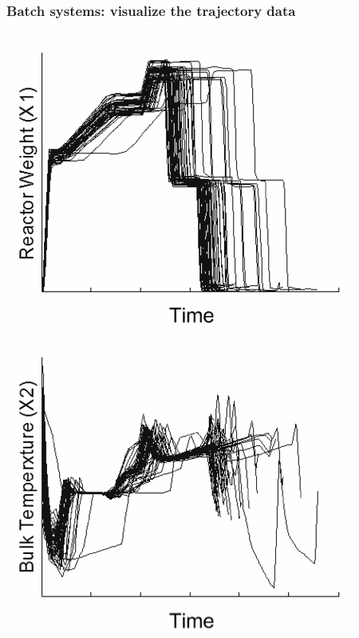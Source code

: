 \begin{frame}\frametitle{Batch systems: visualize the trajectory data}
	
	\begin{columns}
			{}
 			\vfill
			\includegraphics[height=0.8\textheight]{images/unaligned-trajectories-many-batches.png}
		

\end{columns}
\end{frame}
